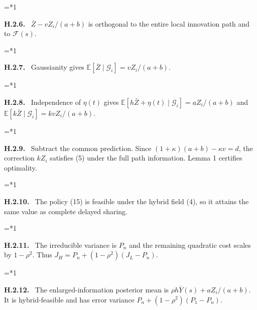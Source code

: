 \documentclass[11pt,letterpaper]{article}
\newcommand{\E}{\mathbb E}
\newenvironment{proofstep}[2]{%
  \begin{list}{}{\leftmargin=\dimexpr 0.17in*#2\relax%
  \setlength{\rightmargin}{0pt}\setlength{\topsep}{5pt}\setlength{\parsep}{2pt}}%
  \item[]\textbf{\textcolor{ink}{#1.}}\ }{\end{list}}
\begin{document}
\begin{proofstep}{H.2.6}{1}
$\bar Z-vZ_i/(a+b)$ is orthogonal to the entire local innovation path and to $\mathcal F(s)$.
\par\nopagebreak{}
\end{proofstep}
\begin{proofstep}{H.2.7}{1}
Gaussianity gives $\E[\bar Z\mid\mathcal G_i]=vZ_i/(a+b)$.
\par\nopagebreak{}
\end{proofstep}
\begin{proofstep}{H.2.8}{1}
Independence of $\eta(t)$ gives $\E[h\bar Z+\eta(t)\mid\mathcal G_i]=aZ_i/(a+b)$ and $\E[k\bar Z\mid\mathcal G_i]=kvZ_i/(a+b)$.
\par\nopagebreak{}
\end{proofstep}
\begin{proofstep}{H.2.9}{1}
Subtract the common prediction. Since $(1+\kappa)(a+b)-\kappa v=d$, the correction $kZ_i$ satisfies (5) under the full path information. Lemma 1 certifies optimality.
\par\nopagebreak{}
\end{proofstep}
\begin{proofstep}{H.2.10}{1}
The policy (15) is feasible under the hybrid field (4), so it attains the same value as complete delayed sharing.
\par\nopagebreak{}
\end{proofstep}
\begin{proofstep}{H.2.11}{1}
The irreducible variance is $P_n$ and the remaining quadratic cost scales by $1-\rho^2$. Thus $J_H=P_n+(1-\rho^2)(J_L-P_n)$.
\par\nopagebreak{}
\end{proofstep}
\begin{proofstep}{H.2.12}{1}
The enlarged-information posterior mean is $\rho h\bar Y(s)+aZ_i/(a+b)$. It is hybrid-feasible and has error variance $P_n+(1-\rho^2)(P_1-P_n)$.
\par\nopagebreak{}
\end{proofstep}
\end{document}
